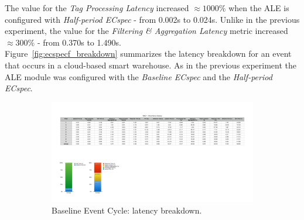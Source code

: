 The value for the \textit{Tag Processing Latency} increased $\approx1000\%$ when the \gls{ALE} is configured
with \textit{Half-period ECspec} - from 0.002s to 0.024s. Unlike in the previous experiment, the value
for the \textit{Filtering \& Aggregation Latency} metric increased $\approx300\%$ - from 0.370s to 1.490s.\\

Figure~\ref{fig:ecspecf_breakdown} summarizes the latency breakdown for an event that occurs in a cloud-based
smart warehouse. As in the previous experiment the \gls{ALE} module was configured with the
\textit{Baseline ECspec} and the \textit{Half-period ECspec}.\\

\begin{figure}[ht!]
  \centering
  \begin{subfigure}{.5\textwidth}
    \centering
    \includegraphics[height=\linewidth]{./images/cloud_ecspec_breakdown}
    \caption{Baseline Event Cycle: latency breakdown.}
    \label{fig:ecspecf_base}
  \end{subfigure}%
  \begin{subfigure}{.5\textwidth}
    \centering

\end{subfigure}
\end{figure}
